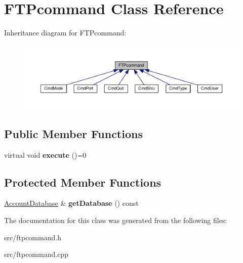 \hypertarget{classFTPcommand}{}\section{F\+T\+Pcommand Class Reference}
\label{classFTPcommand}


Inheritance diagram for F\+T\+Pcommand\+:
\nopagebreak
\begin{figure}[H]
\begin{center}
\leavevmode
\includegraphics[width=350pt]{classFTPcommand__inherit__graph}
\end{center}
\end{figure}
\subsection*{Public Member Functions}
\begin{DoxyCompactItemize}
\item 
\mbox{\label{classFTPcommand_ac4fe208ea474b76351757d4b68f4a216}} 
virtual void {\bfseries execute} ()=0
\end{DoxyCompactItemize}
\subsection*{Protected Member Functions}
\begin{DoxyCompactItemize}
\item 
\mbox{\label{classFTPcommand_a005d2bf44becdcce98214c11c14a3eaf}} 
\hyperlink{classAccountDatabase}{Account\+Database} \& {\bfseries get\+Database} () const
\end{DoxyCompactItemize}


The documentation for this class was generated from the following files\+:\begin{DoxyCompactItemize}
\item 
src/ftpcommand.\+h\item 
src/ftpcommand.\+cpp\end{DoxyCompactItemize}
